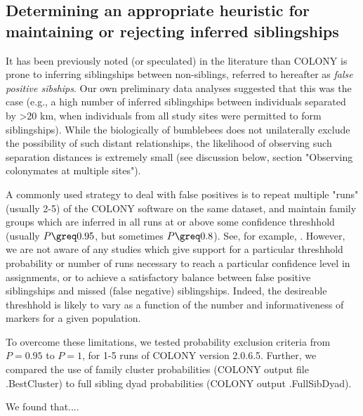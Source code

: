 \documentclass[12pt]{article}
\begin{document}
\subsection{Determining an appropriate heuristic for maintaining or rejecting inferred siblingships}

It has been previously noted (or speculated) in the literature than COLONY is prone to inferring siblingships between non-siblings, referred to hereafter as \emph{false positive sibships}. Our own preliminary data analyses suggested that this was the case (e.g., a high number of inferred siblingships between individuals separated by >20 km, when individuals from all study sites were permitted to form siblingships). While the biologically of bumblebees does not unilaterally exclude the possibility of such distant relationships, the likelihood of observing such separation distances is extremely small (see discussion below, section "Observing colonymates at multiple sites").

A commonly used strategy to deal with false positives is to repeat multiple "runs" (usually 2-5) of the COLONY software on the same dataset, and maintain family groups which are inferred in all runs at or above some confidence threshhold (usually $P \greq 0.95$, but sometimes $P \greq 0.8$). See, for example, \textcite{carvellMolecularSpatialAnalyses2012, raoBumbleBeeHymenoptera2012, dreierFinescaleSpatialGenetic2014a, geibBumbleBeeNest2015a, carvellBumblebeeFamilyLineage2017a, molaWildfireRevealsTransient2020a}. However, we are not aware of any studies which give support for a particular threshhold probability or number of runs necessary to reach a particular confidence level in assignments, or to achieve a satisfactory balance between false positive siblingships and missed (false negative) siblingships. Indeed, the desireable threshhold is likely to vary as a function of the number and informativeness of markers for a given population.

To overcome these limitations, we tested probability exclusion criteria from $P = 0.95$ to $P = 1$, for 1-5 runs of COLONY version 2.0.6.5. Further, we compared the use of family cluster probabilities (COLONY output file .BestCluster) to full sibling dyad probabilities (COLONY output .FullSibDyad).

We found that....

\end{document}
